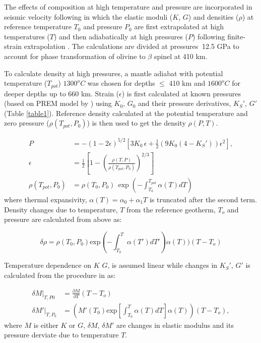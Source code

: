 \documentclass[draft,linenumbers]{agujournal2018}
\begin{document}
The effects of composition at high temperature and pressure are incorporated in seismic velocity following \citet{Cammarano2003} in which the elastic moduli ($K$, $G$) and densities ($\rho$) at reference temperature $T_0$ and pressure $P_0$ are first extrapolated at high temperatures ($T$) and then adiabatically at high pressures ($P$) following finite-strain extrapolation \citep{duffy1989seismic}. The calculations are divided at pressures $~$12.5 GPa to account for phase transformation of olivine to $\beta$ spinel at 410 km. 

To calculate density at high pressures, a mantle adiabat with potential temperature ($T_{pot}$) $1300^o C$ was chosen for depths $\leq$ 410 km and $1600^o C $ for deeper depths up to 660 km. Strain ($\epsilon$) is first calculated at known pressures (based on PREM model by \citet{dziewonski1981preliminary}) using $K_0$, $G_0$ and their pressure derivatives, $K_S'$, $G'$  (Table \ref{table1}).  Reference density calculated at the potential temperature and zero pressure ($\rho(T_{pot}, P_0)$) is then used to get the density $\rho (P,T)$.

\begin{align*} 
    P &=  - (1 - 2\epsilon)^{5/2} \left[ 3K_0\, \epsilon + \frac{1}{2} \left( 9K_0 ( 4 - K_S' ) \right) \epsilon^2 \right], \\
    \epsilon &= \frac{1}{2} \left[ 1 - \left( \frac{\rho(T,P)}{\rho(T_{pot}, P_0)} \right) ^{2/3} \right] \\
    \rho(T_{pot}, P_0) &=  \rho(T_0, P_0) \, \exp \left( - \int_{T_0}^{T_{pot}} \alpha (T) dT \right)
\end{align*}
where thermal expansivity, $\alpha(T) = \alpha_0 + \alpha_1 T$ is truncated after the second term. Density changes due to temperature, $T$ from the reference geotherm, $T_o$ and pressure are calculated from above as:

\begin{equation}\label{den_der}
    \delta \rho = \rho(T_0, P_0) \text{exp} \left( - \int_{T_0}^{T} \alpha (T') dT' \right) \alpha(T) ) (T - T_o)
\end{equation}

Temperature dependence on $K$ $G$, is assumed linear while changes in $K_S'$, $G'$ is calculated from the procedure in \citep{duffy1989seismic} as: 

\begin{align*} 
    \delta M\vert_{T, P0} &= \frac{\partial M}{\partial T }  ( T - T_o )\\
    \delta M'\vert_{T, P_0} &=  \left( M'(T_0) \text{exp} \left[ \int_{T_0}^{T} \alpha (T) dT \right] \alpha(T) \right) ( T - T_o )  ,
\end{align*}
where $M$ is either $K$ or $G$, $\delta M$, $\delta M'$ are changes in elastic modulus and its  pressure derviate due to temperature $T$.
\end{document}
